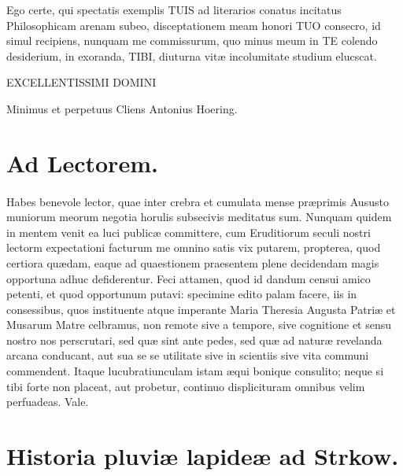 \documentclass[a4paper, 11pt, oneside, polutonikogreek, latin]{article}
\begin{document}
Ego certe, qui spectatis exemplis TUIS ad literarios conatus incitatus Philosophicam arenam subeo, disceptationem meam honori TUO consecro, id simul recipiens, nunquam me commissurum, quo minus meum in TE colendo desiderium, in exoranda, TIBI, diuturna vitæ incolumitate studium elucscat.
\begin{center}
EXCELLENTISSIMI DOMINI
\end{center}
\begin{center}
Minimus et perpetuus Cliens Antonius Hoering.
\end{center}
\clearpage
\section[Ad Lectorem.]{\bfseries{Ad Lectorem.}}
\paragraph{}
Habes benevole lector, quae inter crebra et cumulata mense præprimis Aususto muniorum meorum negotia horulis subsecivis meditatus sum. Nunquam quidem in mentem venit ea luci publicæ committere, cum Eruditiorum seculi nostri lectorm expectationi facturum me omnino satis vix putarem, propterea, quod certiora quædam, eaque ad quaestionem praesentem plene decidendam magis opportuna adhuc defiderentur. Feci attamen, quod id dandum censui amico petenti, et quod opportunum putavi: specimine edito palam facere, iis in consessibus, quos instituente atque imperante Maria Theresia Augusta Patriæ et Musarum Matre celbramus, non remote sive a tempore, sive cognitione et sensu nostro nos perscrutari, sed quæ sint ante pedes, sed quæ ad naturæ revelanda arcana conducant, aut sua se se utilitate sive in scientiis sive vita communi commendent. Itaque lucubratiunculam istam æqui bonique consulito; neque si tibi forte non placeat, aut probetur, continuo displicituram omnibus velim perfuadeas. Vale.
\clearpage
\section[Historia pluviæ lapideæ ad Strkow.]{\bfseries{Historia pluviæ lapideæ ad Strkow.}}
\end{document}

